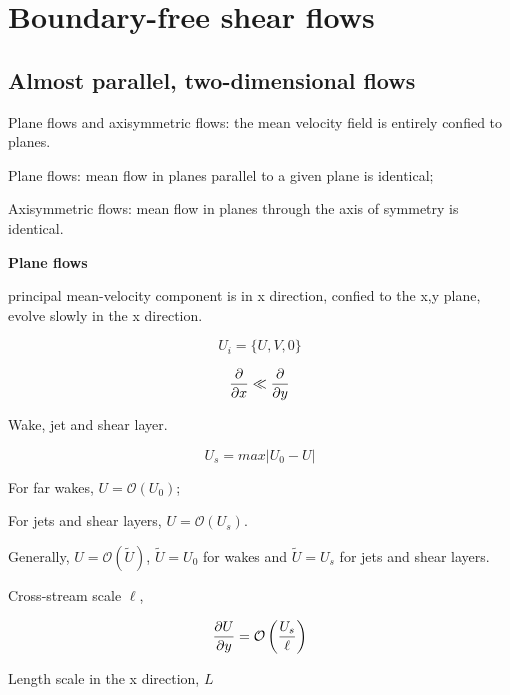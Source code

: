 \documentclass{article}
\begin{document}
\title{}
\author{}
\date{}
\fi

\section{Boundary-free shear flows}

\subsection{Almost parallel, two-dimensional flows}

Plane flows and axisymmetric flows: the mean velocity field is entirely confied to planes.

Plane flows: mean flow in planes parallel to a given plane is identical;

Axisymmetric flows: mean flow in planes through the axis of symmetry is identical.

\textbf{Plane flows}

principal mean-velocity component is in x direction, confied to the x,y plane, evolve slowly in the x direction.

\begin{equation*}
    U_i=\{U,V,0\}
\end{equation*}

\begin{equation*}
    \frac{\mathop{}\!\partial}{\mathop{}\!\partial x}\ll\frac{\mathop{}\!\partial}{\mathop{}\!\partial y}
\end{equation*}

Wake, jet and shear layer.

\begin{equation*}
    U_s=max\left|U_0-U\right|
\end{equation*}

For far wakes, $U=\mathcal{O}(U_0)$;

For jets and shear layers, $U=\mathcal{O}(U_s)$.

Generally, $U=\mathcal{O}(\tilde{U})$, $\tilde{U}=U_0$ for wakes and $\tilde{U}=U_s$ for jets and shear layers.

Cross-stream scale $\ell$,

\begin{equation*}
    \frac{\mathop{}\!\partial U}{\mathop{}\!\partial y}=\mathcal{O}\left(\frac{U_s}{\ell}\right)
\end{equation*}

Length scale in the x direction, $L$
\end{document}

